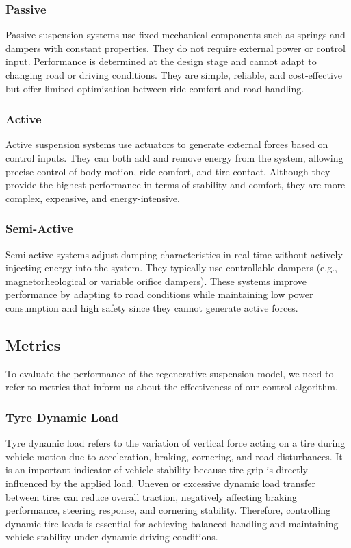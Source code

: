 \subsubsection{Passive}
Passive suspension systems use fixed mechanical components such as springs and dampers with constant properties. They do not require external power or control input. Performance is determined at the design stage and cannot adapt to changing road or driving conditions. They are simple, reliable, and cost-effective but offer limited optimization between ride comfort and road handling.
\subsubsection{Active}
Active suspension systems use actuators to generate external forces based on control inputs. They can both add and remove energy from the system, allowing precise control of body motion, ride comfort, and tire contact. Although they provide the highest performance in terms of stability and comfort, they are more complex, expensive, and energy-intensive.
\subsubsection{Semi-Active}
Semi-active systems adjust damping characteristics in real time without actively injecting energy into the system. They typically use controllable dampers (e.g., magnetorheological or variable orifice dampers). These systems improve performance by adapting to road conditions while maintaining low power consumption and high safety since they cannot generate active forces.

  \subsection{Metrics}
  To evaluate the performance of the regenerative suspension model, we need to refer to metrics that inform us about the effectiveness of our control algorithm.
  \subsubsection{Tyre Dynamic Load}
    Tyre dynamic load refers to the variation of vertical force acting on a tire during vehicle motion due to acceleration, braking, cornering, and road disturbances. It is an important indicator of vehicle stability because tire grip is directly influenced by the applied load. Uneven or excessive dynamic load transfer between tires can reduce overall traction, negatively affecting braking performance, steering response, and cornering stability. Therefore, controlling dynamic tire loads is essential for achieving balanced handling and maintaining vehicle stability under dynamic driving conditions.  
